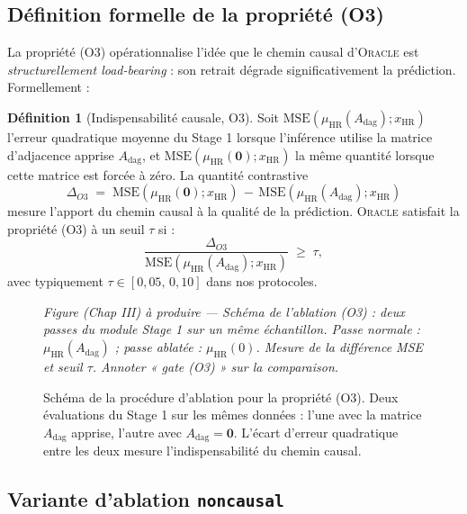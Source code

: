 \documentclass[14pt,a4paper,openany]{extreport}
\theoremstyle{definition}
\newtheorem{definition}{Définition}[chapter]
\newcommand{\Oracle}{\textsc{Oracle}}
\newcommand{\HR}{\ensuremath{\text{HR}}}
\newcommand{\xHR}{\ensuremath{x_{\HR}}}
\newcommand{\muHR}{\ensuremath{\mu_{\HR}}}
\newcommand{\Adag}{\ensuremath{A_{\mathrm{dag}}}}
\newcommand{\figplaceholder}[2][0.9\linewidth]{%
  \begin{tcolorbox}[width=#1,height=5cm,valign=center,colback=gray!8,colframe=gray!45,arc=2pt,boxrule=0.5pt]
    \centering\small\textit{#2}
  \end{tcolorbox}%
}
\begin{document}
\subsection{Définition formelle de la propriété (O3)}
\label{ssec:oracle-o3-def}

La propriété (O3) opérationnalise l'idée que le chemin causal d'\Oracle{} est \emph{structurellement load-bearing} : son retrait dégrade significativement la prédiction. Formellement :

\begin{definition}[Indispensabilité causale, O3]\label{def:o3}
Soit $\mathrm{MSE}\!\left( \muHR(\Adag); \xHR \right)$ l'erreur quadratique moyenne du Stage 1 lorsque l'inférence utilise la matrice d'adjacence apprise $\Adag$, et $\mathrm{MSE}\!\left( \muHR(\mathbf{0}); \xHR \right)$ la même quantité lorsque cette matrice est forcée à zéro. La quantité contrastive
\begin{equation}
  \Delta_{O3} \;=\; \mathrm{MSE}\!\left( \muHR(\mathbf{0}); \xHR \right) \,-\, \mathrm{MSE}\!\left( \muHR(\Adag); \xHR \right)
  \label{eq:delta-o3}
\end{equation}
mesure l'apport du chemin causal à la qualité de la prédiction. \Oracle{} satisfait la propriété (O3) à un seuil $\tau$ si :
\begin{equation}
  \frac{\Delta_{O3}}{\mathrm{MSE}\!\left( \muHR(\Adag); \xHR \right)} \;\geq\; \tau,
  \label{eq:o3-criterion}
\end{equation}
avec typiquement $\tau \in [0{,}05,\, 0{,}10]$ dans nos protocoles.
\end{definition}

\begin{figure}[ht]
  \centering
  \figplaceholder[0.85\linewidth]{Figure (Chap III) à produire --- Schéma de l'ablation (O3) : deux passes du module \emph{Stage 1} sur un même échantillon. Passe normale : $\muHR(\Adag)$ ; passe ablatée : $\muHR(0)$. Mesure de la différence MSE et seuil $\tau$. Annoter « gate (O3) » sur la comparaison.}
  \caption{Schéma de la procédure d'ablation pour la propriété (O3). Deux évaluations du Stage 1 sur les mêmes données : l'une avec la matrice $\Adag$ apprise, l'autre avec $\Adag = \mathbf{0}$. L'écart d'erreur quadratique entre les deux mesure l'indispensabilité du chemin causal.}
  \label{fig:o3-gate}
\end{figure}

\subsection{Variante d'ablation \texttt{noncausal}}
\label{ssec:oracle-noncausal}
\end{document}
